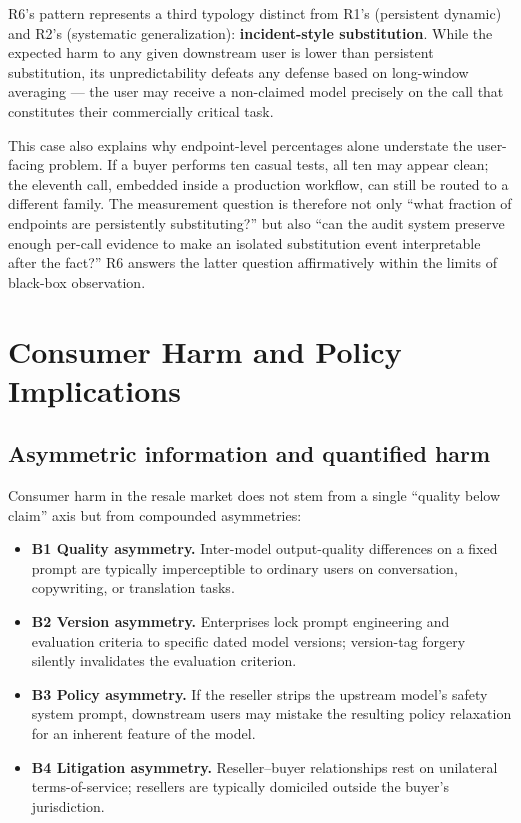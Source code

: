 \documentclass[10pt,a4paper,twocolumn]{article}
\begin{document}
R6's pattern represents a third typology distinct from R1's (persistent
dynamic) and R2's (systematic generalization): \textbf{incident-style
substitution}. While the expected harm to any given downstream user is lower
than persistent substitution, its unpredictability defeats any defense based
on long-window averaging --- the user may receive a non-claimed model
precisely on the call that constitutes their commercially critical task.

This case also explains why endpoint-level percentages alone understate the
user-facing problem. If a buyer performs ten casual tests, all ten may appear
clean; the eleventh call, embedded inside a production workflow, can still be
routed to a different family. The measurement question is therefore not only
``what fraction of endpoints are persistently substituting?'' but also
``can the audit system preserve enough per-call evidence to make an isolated
substitution event interpretable after the fact?'' R6 answers the latter
question affirmatively within the limits of black-box observation.

\section{Consumer Harm and Policy Implications}\label{sec:policy}

\subsection{Asymmetric information and quantified harm}
Consumer harm in the resale market does not stem from a single ``quality below
claim'' axis but from compounded asymmetries:

\begin{itemize}
\item \textbf{B1 Quality asymmetry.} Inter-model output-quality differences on
  a fixed prompt are typically imperceptible to ordinary users on
  conversation, copywriting, or translation tasks.
\item \textbf{B2 Version asymmetry.} Enterprises lock prompt engineering and
  evaluation criteria to specific dated model versions; version-tag forgery
  silently invalidates the evaluation criterion.
\item \textbf{B3 Policy asymmetry.} If the reseller strips the upstream model's
  safety system prompt, downstream users may mistake the resulting policy
  relaxation for an inherent feature of the model.
\item \textbf{B4 Litigation asymmetry.} Reseller--buyer relationships rest on
  unilateral terms-of-service; resellers are typically domiciled outside the
  buyer's jurisdiction.
\end{itemize}
\end{document}
